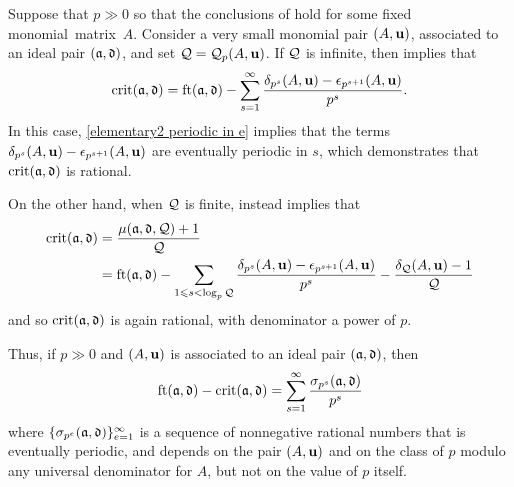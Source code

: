 \documentclass{amsart}
\begin{document}
Suppose that $p \gg 0$ so that the conclusions of  hold for some fixed monomial~matrix~$A$.  Consider a very small monomial pair $(A,\mathbf{u})$, associated to an ideal pair $(\mathfrak{a},\mathfrak{d})$, and set $\mathcal{Q} = \mathcal{Q}_p(A,\mathbf{u})$.
If $\mathcal{Q}$ is infinite, then   implies that
\begin{equation}\label{eq: crit infinite case}
\operatorname{crit}(\mathfrak{a},\mathfrak{d})=\operatorname{ft}(\mathfrak{a}, \mathfrak{d}) - \sum_{s=1}^{\infty} \frac{\delta_{p^s}(A,\mathbf{u})-\epsilon_{p^{s+1}}(A,\mathbf{u})}{p^s}.
\end{equation}
In this case, \eqref{elementary2 periodic in e} implies that the terms $\delta_{p^s}(A,\mathbf{u})-\epsilon_{p^{s+1}}(A,\mathbf{u})$ are eventually periodic in $s$, which demonstrates that $\operatorname{crit}(\mathfrak{a},\mathfrak{d})$ is rational.

On the other hand, when $\mathcal{Q}$ is finite,  instead implies that
\begin{align*}
\operatorname{crit}(\mathfrak{a},\mathfrak{d})& = \frac{\mu(\mathfrak{a},\mathfrak{d}, \mathcal{Q}) +1}{\mathcal{Q}} \\
& = \operatorname{ft}(\mathfrak{a}, \mathfrak{d}) -  \sum_{1 \leqslant s < \log_p \mathcal{Q}} \frac{\delta_{p^s}(A,\mathbf{u})-\epsilon_{p^{s+1}}(A,\mathbf{u})}{p^s} -  \frac{ \delta_{\mathcal{Q}}(A,\mathbf{u})-1}{\mathcal{Q}}
\end{align*}
and so $\operatorname{crit}(\mathfrak{a},\mathfrak{d})$ is again rational, with denominator a power of $p$.

Thus, if $p \gg 0$ and $(A,\mathbf{u})$ is associated to an ideal pair $(\mathfrak{a}, \mathfrak{d})$, then
\[ \operatorname{ft}(\mathfrak{a}, \mathfrak{d}) - \operatorname{crit}(\mathfrak{a}, \mathfrak{d}) = \sum_{s=1}^{\infty} \frac{ \sigma_{p^s}(\mathfrak{a},\mathfrak{d})}{p^s} \]
where $\{ \sigma_{p^e}(\mathfrak{a},\mathfrak{d}) \}_{e=1}^{\infty}$ is a sequence of nonnegative rational numbers that is eventually periodic, and depends on the pair $(A,\mathbf{u})$ and on the class of $p$ modulo any universal denominator for $A$, but not on the value of $p$ itself.
\end{document}
